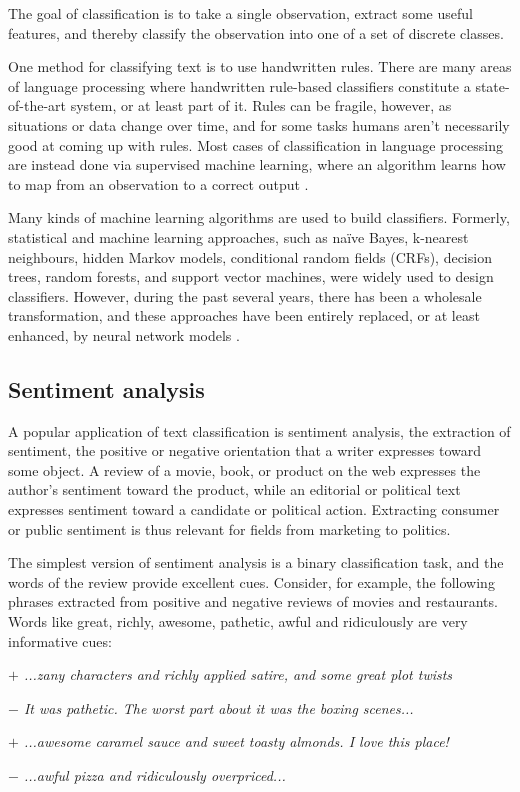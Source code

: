 The goal of classification is to take a single observation, extract some useful features, and thereby classify the observation into one of a set of discrete classes.

One method for classifying text is to use handwritten rules. There are many areas of language processing where handwritten rule-based classifiers constitute a state-of-the-art system, or at least part of it. Rules can be fragile, however, as situations or data change over time, and for
some tasks humans aren't necessarily good at coming up with rules. Most cases of classification in language processing are instead done via supervised machine learning, where an algorithm learns how to map from an observation to a correct output \cite{Jurafsky2009}.

Many kinds of machine learning algorithms are used to build classifiers.
Formerly, statistical and machine learning approaches, such as naïve Bayes, k-nearest neighbours, hidden Markov models, conditional random fields (CRFs), decision trees, random forests, and support vector machines, were widely used to design classifiers. 
However, during the past several years, there has been a wholesale transformation, and these approaches have been entirely replaced, or at least enhanced, by neural network models \cite{surveyNlpDeepLearning}. 

\subsection{Sentiment analysis}\label{subsec:sentiment-analysis}
A popular application of text classification is sentiment analysis, the extraction of sentiment, the positive or negative orientation that a writer expresses toward some object. A review of a movie, book, or product on the web expresses the author's sentiment toward the product, while an editorial or political text expresses sentiment toward a candidate or political action. Extracting consumer or public sentiment is thus relevant for fields from marketing to politics. \cite{Jurafsky2009}

The simplest version of sentiment analysis is a binary classification task, and
the words of the review provide excellent cues. Consider, for example, the following phrases extracted from positive and negative reviews of movies and restaurants. Words like great, richly, awesome, pathetic, awful and ridiculously are very informative cues:

\emph{$+$ ...zany characters and richly applied satire, and some great plot twists}
\par
\emph{$-$ It was pathetic. The worst part about it was the boxing scenes...}
\par
\emph{$+$ ...awesome caramel sauce and sweet toasty almonds. I love this place!}
\par
\emph{$-$ ...awful pizza and ridiculously overpriced...} 

